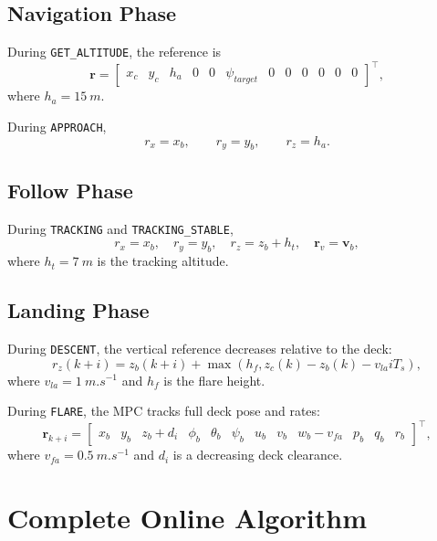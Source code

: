 \documentclass[12pt,a4paper]{article}
\begin{document}
\subsection{Navigation Phase}
During \texttt{GET\_ALTITUDE}, the reference is
\begin{equation}
\bm{r}=
\begin{bmatrix}
x_c & y_c & h_a & 0 & 0 & \psi_{target} & 0 & 0 & 0 & 0 & 0 & 0
\end{bmatrix}^{\top},
\end{equation}
where $h_a=\SI{15}{m}$.

During \texttt{APPROACH},
\begin{equation}
r_x=x_b,\qquad r_y=y_b,\qquad r_z=h_a.
\end{equation}

\subsection{Follow Phase}
During \texttt{TRACKING} and \texttt{TRACKING\_STABLE},
\begin{equation}
r_x=x_b,\quad r_y=y_b,\quad r_z=z_b+h_t,\quad
\bm{r}_{v}=\bm{v}_b,
\end{equation}
where $h_t=\SI{7}{m}$ is the tracking altitude.

\subsection{Landing Phase}
During \texttt{DESCENT}, the vertical reference decreases relative to the deck:
\begin{equation}
r_z(k+i)=z_b(k+i)+\max(h_f,z_c(k)-z_b(k)-v_{la}iT_s),
\end{equation}
where $v_{la}=\SI{1}{m.s^{-1}}$ and $h_f$ is the flare height.

During \texttt{FLARE}, the MPC tracks full deck pose and rates:
\begin{equation}
\bm{r}_{k+i}=
\begin{bmatrix}
x_b & y_b & z_b+d_i & \phi_b & \theta_b & \psi_b &
u_b & v_b & w_b-v_{fa} & p_b & q_b & r_b
\end{bmatrix}^{\top},
\end{equation}
where $v_{fa}=\SI{0.5}{m.s^{-1}}$ and $d_i$ is a decreasing deck clearance.

\section{Complete Online Algorithm}
\end{document}
